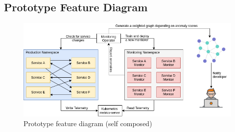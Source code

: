 \subsection{Prototype Feature Diagram}
\begin{figure}[H]
    \centering
    \includegraphics[width=16cm]{assets/introduction/High-level-system-diagram.png}
    \caption{Prototype feature diagram (self composed)}
    \label{fig:high-level-diagram}
\end{figure}